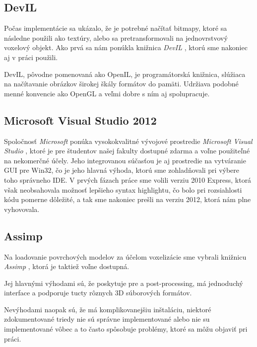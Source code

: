 %
%
%

\subsection{DevIL}
Počas implementácie sa ukázalo, že je potrebné načítať bitmapy, ktoré sa následne použili ako textúry, alebo sa pretransformovali na jednovrstvový voxelový objekt. Ako prvá sa nám ponúkla knižnica \textit{DevIL} \cite{devil}, ktorú sme nakoniec aj v práci použili.

DevIL, pôvodne pomenovaná ako OpenIL, je programátorská knižnica, slúžiaca na načítavanie obrázkov širokej škály formátov do pamäti. Udržiava podobné menné konvencie ako OpenGL a veľmi dobre s ním aj spolupracuje.

\subsection{Microsoft Visual Studio 2012}
Spoločnosť \textit{Microsoft} ponúka vysokokvalitné vývojové prostredie \textit{Microsoft Visual Studio} \cite{mvs}, ktoré je pre študentov našej fakulty dostupné zdarma a voľne použiteľné na nekomerčné účely.
Jeho integrovanou súčasťou je aj prostredie na vytváranie GUI pre Win32, čo je jeho hlavná výhoda, ktorú sme zohladňovali pri výbere toho správneho IDE.
V prvých fázach práce sme volili verziu 2010 Express, ktorá však neobsahovala možnosť lepšieho syntax highlightu, čo bolo pri rozsiahlosti kódu pomerne dôležité, a tak sme nakoniec prešli na verziu 2012, ktorá nám plne vyhovovala.

\subsection{Assimp}
Na loadovanie povrchových modelov za účelom voxelizácie sme vybrali knižnicu \textit{Assimp} \cite{assimp}, ktorá je taktiež voľne dostupná.

Jej hlavnými výhodami sú, že poskytuje pre a post-processing, má jednoduchý interface a podporuje tucty rôznych 3D súborových formátov.

Nevýhodami naopak sú, že má komplikovanejšiu inštaláciu, niektoré zdokumentované triedy nie sú správne implementované alebo nie su implementované vôbec a to často spôsobuje problémy, ktoré sa môžu objaviť pri práci.
